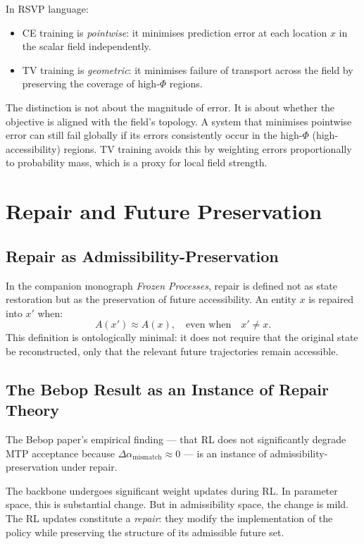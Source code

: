 \documentclass[11pt, a4paper, openany]{book}
\theoremstyle{plain}
\theoremstyle{definition}
\theoremstyle{remark}
\begin{document}
In RSVP language:
\begin{itemize}
  \item CE training is \emph{pointwise}: it minimises prediction error at
    each location $x$ in the scalar field independently.
  \item TV training is \emph{geometric}: it minimises failure of transport
    across the field by preserving the coverage of high-$\Phi$ regions.
\end{itemize}

The distinction is not about the magnitude of error.
It is about whether the objective is aligned with the field's topology.
A system that minimises pointwise error can still fail globally
if its errors consistently occur in the high-$\Phi$ (high-accessibility)
regions.
TV training avoids this by weighting errors proportionally to probability mass,
which is a proxy for local field strength.

\chapter{Repair and Future Preservation}
\label{ch:repair}

\section{Repair as Admissibility-Preservation}

In the companion monograph \emph{Frozen Processes}, repair is defined
not as state restoration but as the preservation of future accessibility.
An entity $x$ is repaired into $x'$ when:
\[
  A(x') \approx A(x), \quad\text{even when}\quad x' \neq x.
\]
This definition is ontologically minimal: it does not require that the
original state be reconstructed, only that the relevant future trajectories
remain accessible.

\section{The Bebop Result as an Instance of Repair Theory}

The Bebop paper's empirical finding --- that RL does not significantly degrade
MTP acceptance because $\Delta\alpha_{\mathrm{mismatch}} \approx 0$ ---
is an instance of admissibility-preservation under repair.

The backbone undergoes significant weight updates during RL.
In parameter space, this is substantial change.
But in admissibility space, the change is mild.
The RL updates constitute a \emph{repair}: they modify the implementation
of the policy while preserving the structure of its admissible future set.
\end{document}
